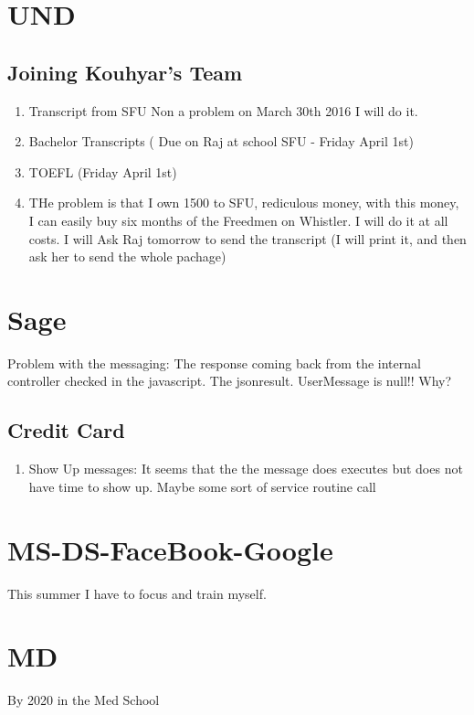 \documentclass{IEEEtran}
\begin{document}
\section{UND}
\subsection{Joining Kouhyar's Team}
\begin{enumerate}
\item Transcript from SFU  Non a problem on March 30th 2016 I will do it. 
\item Bachelor Transcripts ( Due on Raj at school SFU -  Friday April 1st) 
\item TOEFL (Friday April 1st)
\item THe problem is that I own 1500 to SFU, rediculous money, with this money, I can easily buy six months of the Freedmen on Whistler. I will do it at all costs. I will Ask Raj tomorrow to send the transcript (I will print it, and then ask her to send the whole pachage)

\end{enumerate}
\section{Sage}
Problem with the messaging: The response coming back from the internal controller checked in the javascript. The jsonresult. UserMessage is null!! Why? 





\subsection{Credit Card}
\begin{enumerate}
\item Show Up messages: It seems that the the message does executes but does not have time to show up. Maybe some sort of service routine call
\end{enumerate}

\section{MS-DS-FaceBook-Google}
This summer I have to focus and train myself. 

\section{MD}
By 2020 in the Med School
















\end{document}
